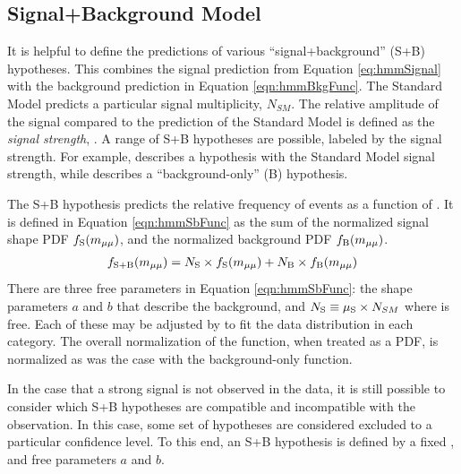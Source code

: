\subsection{Signal+Background Model}

It is helpful to define the predictions of various ``signal+background'' (S+B) hypotheses.
This combines the signal prediction from Equation \ref{eq:hmmSignal} with the background prediction in Equation \ref{eqn:hmmBkgFunc}.
The Standard Model predicts a particular signal multiplicity, $N_{SM}$.
The relative amplitude of the signal compared to the prediction of the Standard Model is defined as the \emph{signal strength}, \mus.
A range of S+B hypotheses are possible, labeled by the signal strength.
For example,  describes a hypothesis with the Standard Model signal strength, while  describes a ``background-only'' (B) hypothesis.

The S+B hypothesis predicts the relative frequency of events as a function of \muu.
It is defined in Equation \ref{eqn:hmmSbFunc} as the sum of the normalized signal shape PDF $f_\text{S}(m_{\mu\mu})$, and the normalized background PDF $f_\text{B}(m_{\mu\mu})$.
\begin{equation}\begin{split}\label{eqn:hmmSbFunc}
f_\text{S+B}(m_{\mu\mu}) = N_\text{S}\times f_\text{S}(m_{\mu\mu}) + N_\text{B}\times f_\text{B}(m_{\mu\mu})
\end{split}\end{equation} 
There are three free parameters in Equation \ref{eqn:hmmSbFunc}: the shape parameters $a$ and $b$ that describe the background, and $N_\text{S}\equiv\mu_\text{S}\times N_{SM}$ where \mus is free.
Each of these may be adjusted by  to fit the data distribution in each category.
The overall normalization of the function, when treated as a PDF, is normalized as was the case with the background-only function.

In the case that a strong signal is not observed in the data, it is still possible to consider which S+B hypotheses are compatible and incompatible with the observation.
In this case, some set of hypotheses are considered excluded to a particular confidence level.
To this end, an S+B hypothesis is defined by a fixed \mus, and free parameters $a$ and $b$.
